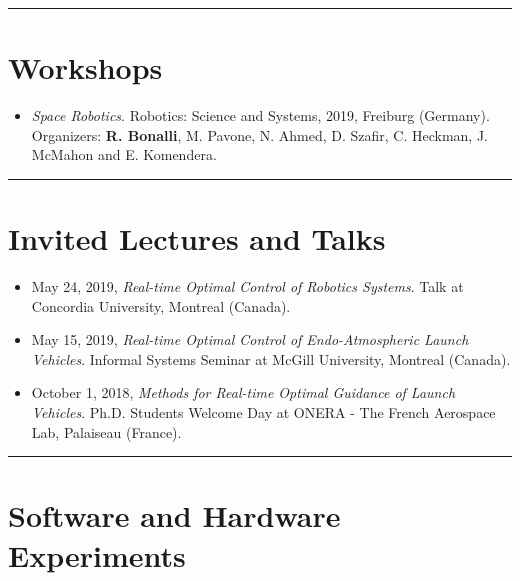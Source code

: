 \documentclass[a4paper,12pt]{article}
\begin{document}
\begingroup
\begin{center}
\noindent\rule{7cm}{0.4pt}
\end{center}
\endgroup

\section{Workshops}

\begin{itemize}
\item \textit{Space Robotics}. Robotics: Science and Systems, 2019, Freiburg (Germany). Organizers: \textbf{R. Bonalli}, M. Pavone, N. Ahmed, D. Szafir, C. Heckman, J. McMahon and E. Komendera.
\end{itemize}

\begingroup
\begin{center}
\noindent\rule{7cm}{0.4pt}
\end{center}
\endgroup

\section{Invited Lectures and Talks}

\begin{itemize}
\item May 24, 2019, \textit{Real-time Optimal Control of Robotics Systems}. Talk at Concordia University, Montreal (Canada).
\item May 15, 2019, \textit{Real-time Optimal Control of Endo-Atmospheric Launch Vehicles}. Informal Systems Seminar at McGill University, Montreal (Canada).
\item October 1, 2018, \textit{Methods for Real-time Optimal Guidance of Launch Vehicles}. Ph.D. Students Welcome Day at ONERA - The French Aerospace Lab, Palaiseau (France).
\end{itemize}

\begingroup
\begin{center}
\noindent\rule{7cm}{0.4pt}
\end{center}
\endgroup

\section{Software and Hardware Experiments}
\end{document}
